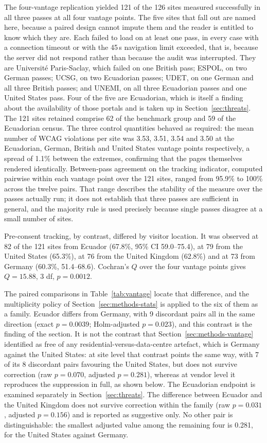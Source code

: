 \documentclass[pdflatex,sn-basic,Numbered,iicol]{sn-jnl}
\theoremstyle{thmstyleone}
\theoremstyle{thmstyletwo}
\theoremstyle{thmstylethree}
\begin{document}
The four-vantage replication yielded 121 of the 126 sites measured successfully in all three passes at all four vantage points. The five sites that fall out are named here, because a paired design cannot impute them and the reader is entitled to know which they are. Each failed to load on at least one pass, in every case with a connection timeout or with the 45\,s navigation limit exceeded, that is, because the server did not respond rather than because the audit was interrupted. They are Universit\'e Paris-Saclay, which failed on one British pass; ESPOL, on two German passes; UCSG, on two Ecuadorian passes; UDET, on one German and all three British passes; and UNEMI, on all three Ecuadorian passes and one United States pass. Four of the five are Ecuadorian, which is itself a finding about the availability of those portals and is taken up in Section~\ref{sec:threats}. The 121 sites retained comprise 62 of the benchmark group and 59 of the Ecuadorian census. The three control quantities behaved as required: the mean number of WCAG violations per site was 3.53, 3.51, 3.54 and 3.50 at the Ecuadorian, German, British and United States vantage points respectively, a spread of 1.1\% between the extremes, confirming that the pages themselves rendered identically. Between-pass agreement on the tracking indicator, computed pairwise within each vantage point over the 121 sites, ranged from 95.9\% to 100\% across the twelve pairs. That range describes the stability of the measure over the passes actually run; it does not establish that three passes are sufficient in general, and the majority rule is used precisely because single passes disagree at a small number of sites.

Pre-consent tracking, by contrast, differed by visitor location. It was observed at 82 of the 121 sites from Ecuador (67.8\%, 95\% CI 59.0--75.4), at 79 from the United States (65.3\%), at 76 from the United Kingdom (62.8\%) and at 73 from Germany (60.3\%, 51.4--68.6). Cochran's $Q$ over the four vantage points gives $Q=15.88$, 3 df, $p=0.0012$.

The paired comparisons in Table~\ref{tab:vantage} locate that difference, and the multiplicity policy of Section~\ref{sec:methods-stats} is applied to the six of them as a family. Ecuador differs from Germany, with 9 discordant pairs all in the same direction (exact $p=0.0039$; Holm-adjusted $p=0.023$), and this contrast is the finding of the section. It is not the contrast that Section~\ref{sec:methods-vantage} identified as free of any residential-versus-data-centre artefact, which is Germany against the United States: at site level that contrast points the same way, with 7 of its 8 discordant pairs favouring the United States, but does not survive correction (raw $p=0.070$, adjusted $p=0.281$), whereas at vendor level it reproduces the suppression in full, as shown below. The Ecuadorian endpoint is examined separately in Section~\ref{sec:threats}. The difference between Ecuador and the United Kingdom does not survive correction within the family (raw $p=0.031$, adjusted $p=0.156$) and is reported as suggestive only. No other pair is distinguishable: the smallest adjusted value among the remaining four is 0.281, for the United States against Germany.
\end{document}
